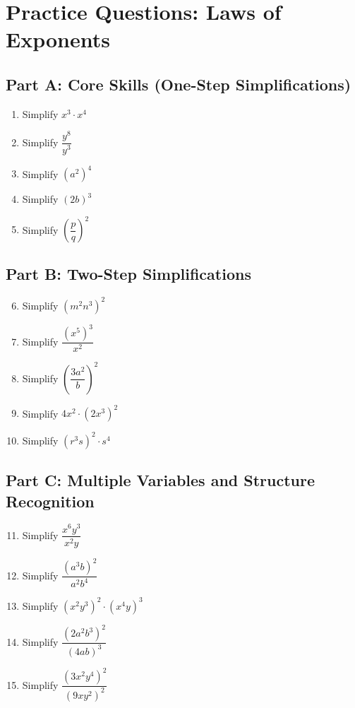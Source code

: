 \documentclass[12pt]{article}
\begin{document}
\section*{Practice Questions: Laws of Exponents}

\subsection*{Part A: Core Skills (One-Step Simplifications)}
\begin{enumerate}
  \item Simplify \(x^3 \cdot x^4\)
  \item Simplify \(\dfrac{y^8}{y^3}\)
  \item Simplify \((a^2)^4\)
  \item Simplify \((2b)^3\)
  \item Simplify \(\left(\dfrac{p}{q}\right)^2\)
\end{enumerate}

\subsection*{Part B: Two-Step Simplifications}
\begin{enumerate}
  \setcounter{enumi}{5}
  \item Simplify \((m^2n^3)^2\)
  \item Simplify \(\dfrac{(x^5)^3}{x^2}\)
  \item Simplify \(\left(\dfrac{3a^2}{b}\right)^2\)
  \item Simplify \(4x^2 \cdot (2x^3)^2\)
  \item Simplify \((r^3s)^2 \cdot s^4\)
\end{enumerate}

\subsection*{Part C: Multiple Variables and Structure Recognition}
\begin{enumerate}
  \setcounter{enumi}{10}
  \item Simplify \(\dfrac{x^6y^3}{x^2y}\)
  \item Simplify \(\dfrac{(a^3b)^2}{a^2b^4}\)
  \item Simplify \((x^2y^3)^2 \cdot (x^4y)^3\)
  \item Simplify \(\dfrac{(2a^2b^3)^2}{(4ab)^3}\)
  \item Simplify \(\dfrac{(3x^2y^4)^2}{(9xy^2)^2}\)
\end{enumerate}
\end{document}

